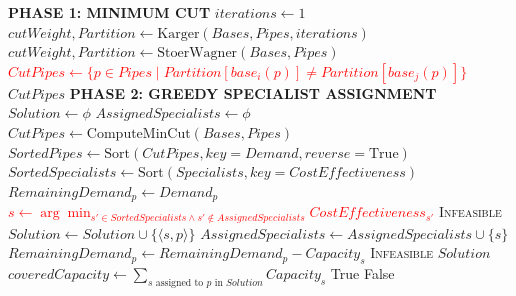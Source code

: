 \documentclass{article}
\begin{document}
\begin{algorithm}[H]
\renewcommand{\thealgorithm}{}
\caption{Greedy Algorithm}
\begin{algorithmic}
\Statex
\Statex \textbf{PHASE 1: MINIMUM CUT}
 
    \State $iterations \gets 1$
    \State $cutWeight, Partition \gets \text{Karger}(Bases, Pipes, iterations)$
\Else {}
    \State $cutWeight, Partition \gets \text{StoerWagner}(Bases, Pipes)$
\EndIf
\State \textcolor{red}{$CutPipes \gets \{p \in Pipes \mid Partition[base_i(p)] \neq Partition[base_j(p)]\}$}
\State \Return $CutPipes$
\EndFunction
\Statex
\Statex \textbf{PHASE 2: GREEDY SPECIALIST ASSIGNMENT}
\State $Solution \gets \phi$
\State $AssignedSpecialists \gets \phi$
\State $CutPipes \gets \text{ComputeMinCut}(Bases, Pipes)$
\Statex
\State $SortedPipes \gets \text{Sort}(CutPipes, key=Demand, reverse=\text{True})$
\Statex
\State $SortedSpecialists \gets \text{Sort}(Specialists, key=CostEffectiveness)$
\Statex
{}
    \State $RemainingDemand_p \gets Demand_p$
        \State {}
        \State \textcolor{red}{$s \gets \arg\min_{s' \in SortedSpecialists \land s' \notin AssignedSpecialists} CostEffectiveness_{s'}$}
            \State \Return \textsc{Infeasible} 
        \EndIf
        \Statex
        \State $Solution \gets Solution \cup \{\langle s, p \rangle\}$ 
        \State $AssignedSpecialists \gets AssignedSpecialists \cup \{s\}$
        \State $RemainingDemand_p \gets RemainingDemand_p - Capacity_s$
    \EndWhile
    \Statex
      
        \State \Return \textsc{Infeasible}
    \EndIf
\EndFor
\Statex
\State
\Return $Solution$
\EndFunction
\Statex
{}
\State $coveredCapacity \gets \sum_{s \text{ assigned to } p \text{ in } Solution} Capacity_s$
    \State \Return True
\Else
    \State \Return False
\EndIf
\EndFunction
\end{algorithmic}
\end{algorithm}
\end{document}
